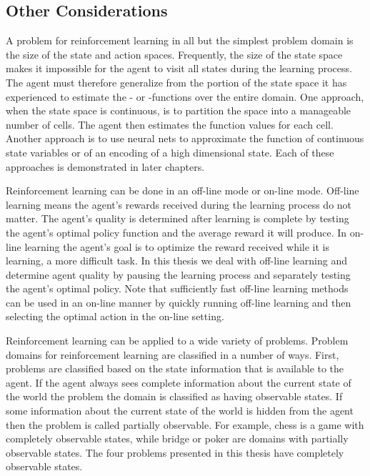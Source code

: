 \subsection{Other Considerations}
A problem for reinforcement learning in all but the simplest problem domain is the size of the state and action spaces.  Frequently, the size of the state space makes it impossible for the agent to visit all states during the learning process.  The agent must therefore generalize from the portion of the state space it has experienced to estimate the  - or  -functions over the entire domain.  One approach, when the state space is continuous, is to partition the space into a manageable number of cells.  The agent then estimates the function values for each cell. Another approach is to use neural nets to approximate the function of continuous state variables or of an encoding of a high dimensional state.  Each of these approaches is demonstrated in later chapters.

Reinforcement learning can be done in an off-line mode or on-line mode.  Off-line learning means the agent’s rewards received during the learning process do not matter.  The agent’s quality is determined after learning is complete by testing the agent’s optimal policy function and the average reward it will produce.  In on-line learning the agent’s goal is to optimize the reward received while it is learning, a more difficult task.  In this thesis we deal with off-line learning and determine agent quality by pausing the learning process and separately testing the agent’s optimal policy.  Note that sufficiently fast off-line learning methods can be used in an on-line manner by quickly running off-line learning and then selecting the optimal action in the on-line setting.

Reinforcement learning can be applied to a wide variety of problems.  Problem domains for reinforcement learning are classified in a number of ways.  First, problems are classified based on the state information that is available to the agent.  If the agent always sees complete information about the current state of the world the problem the domain is classified as having observable states.  If some information about the current state of the world is hidden from the agent then the problem is called partially observable.  For example, chess is a game with completely observable states, while bridge or poker are domains with partially observable states.  The four problems presented in this thesis have completely observable states.

